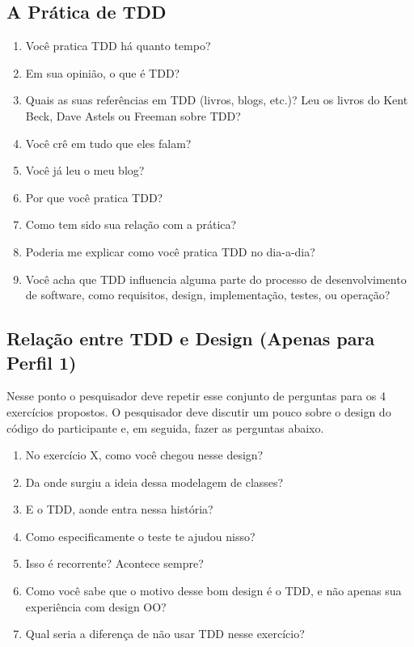 \subsection{A Prática de TDD}
\label{entrevista:pratica}

\begin{enumerate}
	\item Você pratica TDD há quanto tempo?

	\item Em sua opinião, o que é TDD?
	
	\item Quais as suas referências em TDD (livros, blogs, etc.)? 
		  Leu os livros do Kent Beck, Dave Astels ou Freeman sobre TDD?

	\item Você crê em tudo que eles falam?
	
	\item Você já leu o meu blog?
	
	\item Por que você pratica TDD?

	\item Como tem sido sua relação com a prática?

	\item Poderia me explicar como você pratica TDD no dia-a-dia?

	\item Você acha que TDD influencia alguma parte do processo de desenvolvimento
	de software, como requisitos, design, implementação, testes, ou operação?
\end{enumerate}

\subsection{Relação entre TDD e Design (Apenas para Perfil 1)}

Nesse ponto o pesquisador deve repetir esse conjunto de perguntas
para os 4 exercícios propostos.
O pesquisador deve discutir um pouco sobre o design do código do participante e, em seguida,
fazer as perguntas abaixo.

\begin{enumerate}
	
	\item No exercício X, como você chegou nesse design?
	
	\item Da onde surgiu a ideia dessa modelagem de classes?
	
	\item E o TDD, aonde entra nessa história?
	
	\item Como especificamente o teste te ajudou nisso?
	
	\item Isso é recorrente? Acontece sempre?
	
	\item Como você sabe que o motivo desse bom design é o TDD, e não apenas sua experiência
	com design OO?
	
	\item Qual seria a diferença de não usar TDD nesse exercício?
\end{enumerate}

